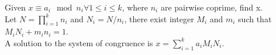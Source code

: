 \normalsize
Given $x \equiv a_i \mod n_i \forall 1 \leq i \leq k$, where $n_i$ are pairwise coprime, find x. \\
Let $N = \prod_{i = 1}^{k}{n_i}$ and $N_i = N / n_i$, there exist integer $M_i$ and $m_i$ such that $M_iN_i + m_in_i = 1$. \\
A solution to the system of congruence is $x = \sum_{i = 1}^{k}{a_iM_iN_i}$. 
